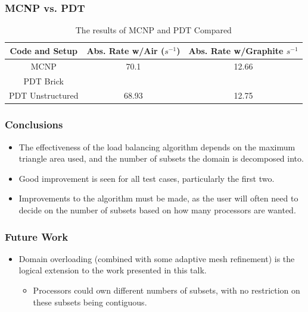 \documentclass[]{beamer}
\begin{document}
\begin{frame}[t]\frametitle{MCNP vs. PDT}
\begin{table}[H]
\centering
\small
\caption{The results of MCNP and PDT Compared}
\begin{tabular}{c | c | c}
\hline
\textbf{Code and Setup} & Abs. Rate w/Air ($s^{-1}$) & Abs. Rate w/Graphite $s^{-1}$\\
\hline
MCNP & 70.1 & 12.66 \\
PDT Brick & & \\
PDT Unstructured & 68.93 & 12.75 \\
\hline

\end{tabular}
\end{table}
\end{frame}

\begin{frame}[t]\frametitle{Conclusions}
\begin{block}{}
\begin{itemize}
\item The effectiveness of the load balancing algorithm depends on the maximum triangle area used, and the number of subsets the domain is decomposed into.
\item Good improvement is seen for all test cases, particularly the first two. 
\item Improvements to the algorithm must be made, as the user will often need to decide on the number of subsets based on how many processors are wanted. 
\end{itemize}
\end{block}
\end{frame}

\begin{frame}[t]\frametitle{Future Work}
\begin{block}{}
\begin{itemize}
\item Domain overloading (combined with some adaptive mesh refinement) is the logical extension to the work presented in this talk.
\begin{itemize} 
\item Processors could own different numbers of subsets, with no restriction on these subsets being contiguous.
\end{itemize}
\end{itemize}
\end{block}
\end{frame}
\end{document}
